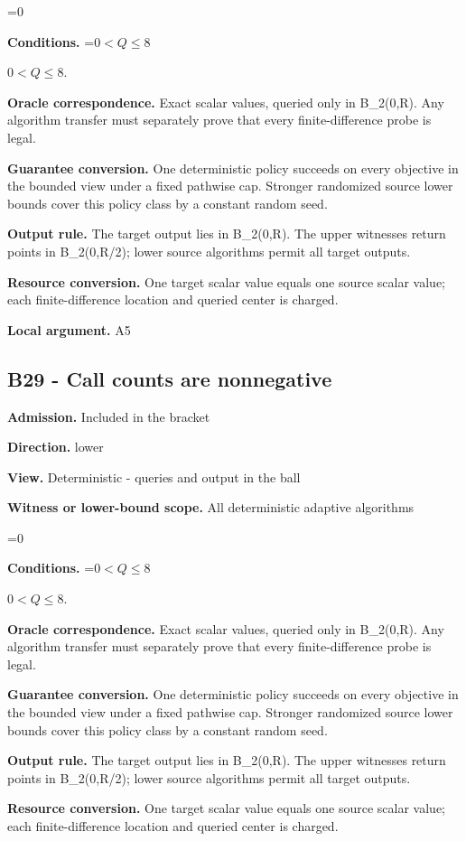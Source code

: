 \documentclass[10pt,a4paper]{article}
\newcommand{\AtlasMath}[1]{\par\begingroup\centering\setbox0=\hbox{$\displaystyle #1$}\ifdim\wd0>1.4\linewidth\typeout{ATLAS WIDE FORMULA: \the\wd0}\fi\ifdim\wd0>\linewidth\resizebox{\linewidth}{!}{\box0}\else\box0\fi\par\endgroup}
\newcommand{\AtlasInlineMath}[1]{\begingroup\setbox0=\hbox{$#1$}\ifdim\wd0>.4\linewidth\endgroup\AtlasMath{#1}\else\endgroup$#1$\fi}
\begin{document}
\AtlasMath{0}
\textbf{Conditions.} \AtlasInlineMath{0<Q\le8}.

\textbf{Oracle correspondence.} Exact scalar values, queried only in B\_2(0,R). Any algorithm transfer must separately prove that every finite-difference probe is legal.

\textbf{Guarantee conversion.} One deterministic policy succeeds on every objective in the bounded view under a fixed pathwise cap. Stronger randomized source lower bounds cover this policy class by a constant random seed.

\textbf{Output rule.} The target output lies in B\_2(0,R). The upper witnesses return points in B\_2(0,R/2); lower source algorithms permit all target outputs.

\textbf{Resource conversion.} One target scalar value equals one source scalar value; each finite-difference location and queried center is charged.

\textbf{Local argument.} A5

\subsection{B29 - Call counts are nonnegative}
\textbf{Admission.} Included in the bracket

\textbf{Direction.} lower

\textbf{View.} Deterministic - queries and output in the ball

\textbf{Witness or lower-bound scope.} All deterministic adaptive algorithms

\AtlasMath{0}
\textbf{Conditions.} \AtlasInlineMath{0<Q\le8}.

\textbf{Oracle correspondence.} Exact scalar values, queried only in B\_2(0,R). Any algorithm transfer must separately prove that every finite-difference probe is legal.

\textbf{Guarantee conversion.} One deterministic policy succeeds on every objective in the bounded view under a fixed pathwise cap. Stronger randomized source lower bounds cover this policy class by a constant random seed.

\textbf{Output rule.} The target output lies in B\_2(0,R). The upper witnesses return points in B\_2(0,R/2); lower source algorithms permit all target outputs.

\textbf{Resource conversion.} One target scalar value equals one source scalar value; each finite-difference location and queried center is charged.
\end{document}
